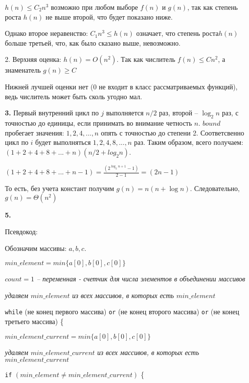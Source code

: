 \documentclass[12pt]{extreport}
\begin{document}
	$ h(n) \leqslant C_2 n^3 $ возможно при любом выборе $ f(n)$ и $ g(n)$, так как степень роста $ h(n)$ не выше второй, что будет показано ниже. 
	
	Однако второе неравенство: $ C_1 n^3 \leqslant h(n) $ означает, что степень роста$ h(n)$  больше третьей, что, как было сказано выше, невозможно. 
	\bigskip
	
	2. Верхняя оценка: $ h(n) = O(n^2) $. Так как числитель $ f(n) \leqslant Cn^2 $, а знаменатель $ g(n) \geqslant C $ 
	
	Нижней лучшей оценки нет (0 не входит в класс рассматриваемых функций), ведь числитель может быть сколь угодно мал. 
	\bigskip
	
	{\bf 3.} Первый внутренний цикл по $j$ выполняется $n/2$ раз, второй -- $\log_2 n$ раз, с точностью до единицы, если принимать во внимание четность $n$. $bound$ пробегает значения: $1, 2, 4, ..., n$ опять с точностью до степени 2.  Соответсвенно цикл по $i$ будет выполняться $1, 2, 4, 8,  ..., n$ раз. 
	Таким образом, всего получаем: $ (1 + 2+ 4+ 8+ ... + n)(n/2 + log_2 n)$. 
	
	$ (1+ 2+ 4+ 8+ ... + n-1) = \frac{(2^{\log_2 n +1} -1)}{2-1} = (2n-1)$ 
	
	То есть, без учета констант получим $ g(n) = n(n + \log n)$. Следовательно, $ g(n) = \Theta(n^2)$
	
	\bigskip
	
	{\bf 5.} 
	
	Псевдокод:
	
	Обозначим массивы: $a, b, c$. 
	
	$min\_element = min \{a[0], b[0], c[0] \}$
	
	$count = 1$ \textit{-- переменная - счетчик для числа элементов  в объединении массивов}
	
	\textit{ удаляем $min\_element$ из всех массивов, в которых есть $min\_element$}
	
	{ \tt while} (не конец первого массива) {\tt or} (не конец второго массива) {\tt or} (не конец третьего массива) \{
	
	\hspace{4mm} $min\_element\_current= min \{a[0], b[0], c[0] \}$
	
	\hspace{4mm} \textit{ удаляем $min\_element\_current$ из всех массивов, в которых есть $min\_element\_current$}
	
	\hspace{4mm} {\tt if} $(min\_element \neq min\_element\_current)$ \{
	
\end{document}
